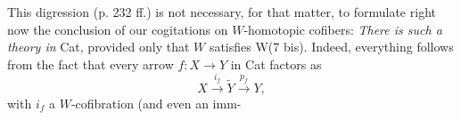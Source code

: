 This digression (p. 232 ff.) is not necessary, for that matter, to formulate right now the conclusion of our cogitations on $W$-homotopic cofibers: \textit{There is such a theory in} Cat, provided only that $W$ satisfies W(7 bis). Indeed, everything follows from the fact that every arrow $f : X \longrightarrow Y$ in Cat factors as
\[
X \xrightarrow{i_f} \tilde{Y} \xrightarrow{p_f} Y,
\]
with $i_f$ a $W$-cofibration (and even an imm-